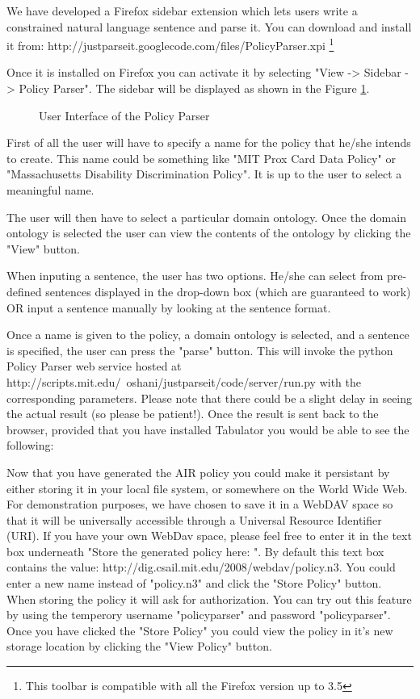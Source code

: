 \documentclass{llncs}
\begin{document}
We have developed a Firefox sidebar extension which lets users write a constrained natural language sentence and parse it. You can download and install it from:
http://justparseit.googlecode.com/files/PolicyParser.xpi
\footnote{This toolbar is compatible with all the Firefox version up to 3.5}

Once it is installed on Firefox you can activate it by selecting "View -> Sidebar -> Policy Parser".
The sidebar will be displayed as shown in the Figure \ref{fig-ui}.

\begin{figure}[!h]
  \centerline{}
  \caption{User Interface of the Policy Parser}
  \label{fig-ui}
\end{figure}

First of all the user will have to specify a name for the policy that he/she intends to create. This name could be something like "MIT Prox Card Data Policy" or "Massachusetts Disability Discrimination Policy". It is up to the user to select a meaningful name.

The user will then have to select a particular domain ontology. Once the domain ontology is selected the user can view the contents of the ontology by clicking the "View" button. 

When inputing a sentence, the user has two options. He/she can select from pre-defined sentences displayed in the drop-down box (which are guaranteed to work) OR input a sentence manually by looking at the sentence format.

Once a name is given to the policy, a domain ontology is selected, and a sentence is specified, the user can press the "parse" button. This will invoke the python Policy Parser web service hosted at http://scripts.mit.edu/~oshani/justparseit/code/server/run.py with the corresponding parameters. Please note that there could be a slight delay in seeing the actual result (so please be patient!). Once the result is sent back to the browser, provided that you have installed Tabulator you would be able to see the following:

Now that you have generated the AIR policy you could make it persistant by either storing it in your local file system, or somewhere on the World Wide Web. For demonstration purposes, we have chosen to save it in a WebDAV space so that it will be universally accessible through a Universal Resource Identifier (URI). If you have your own WebDav space, please feel free to enter it in the text box underneath "Store the generated policy here: ". By default this text box contains the value:
http://dig.csail.mit.edu/2008/webdav/policy.n3. 
You could enter a new name instead of "policy.n3" and click the "Store Policy" button. When storing the policy it will ask for authorization. You can try out this feature by using the temperory username "policyparser" and password "policyparser". Once you have clicked the "Store Policy" you could view the policy in it's new storage location by clicking the "View Policy" button.
\end{document}
